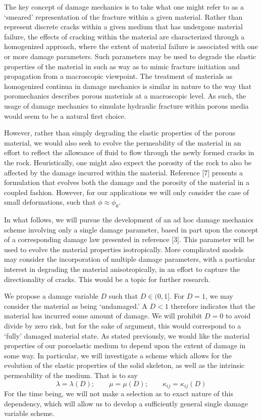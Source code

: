 \documentclass[11pt]{article} %
\begin{document}
The key concept of damage mechanics is to take what one might refer to as a `smeared' representation of the fracture within a given material. Rather than represent discrete cracks within a given medium that has undergone material failure, the effects of cracking within the material are characterized through a homogenized approach, where the extent of material failure is associated with one or more damage parameters. Such parameters may be used to degrade the elastic properties of the material in such as way as to mimic fracture initiation and propagation from a macroscopic viewpoint. The treatment of materials as homogenized continua in damage mechanics is similar in nature to the way that poromechanics describes porous materials at a macroscopic level. As such, the usage of damage mechanics to simulate hydraulic fracture within porous media would seem to be a natural first choice.

However, rather than simply degrading the elastic properties of the porous material, we would also seek to evolve the permeability of the material in an effort to reflect the allowance of fluid to flow through the newly formed cracks in the rock. Heuristically, one might also expect the porosity of the rock to also be affected by the damage incurred within the material. Reference [7] presents a formulation that evolves both the damage and the porosity of the material in a coupled fashion. However, for our applications we will only consider the case of small deformations, such that $\phi \approx \phi_0$.

In what follows, we will pursue the development of an ad hoc damage mechanics scheme involving only a single damage parameter, based in part upon the concept of a corresponding damage law presented in reference [3]. This parameter will be used to evolve the material properties isotropically. More complicated models may consider the incorporation of multiple damage parameters, with a particular interest in degrading the material anisotropically, in an effort to capture the directionality of cracks. This would be a topic for further research.

We propose a damage variable $D$ such that $D \in (0,1]$. For $D = 1$, we may consider the material as being `undamaged.' A $D < 1$ therefore indicates that the material has incurred some amount of damage. We will prohibit $D = 0$ to avoid divide by zero risk, but for the sake of argument, this would correspond to a `fully' damaged material state. As stated previously, we would like the material properties of our poroelastic medium to depend upon the extent of damage in some way. In particular, we will investigate a scheme which allows for the evolution of the elastic properties of the solid skeleton, as well as the intrinsic permeability of the medium. That is to say
\begin{equation}
	\lambda = \lambda (D); \qquad \mu = \mu (D); \qquad \kappa_{ij} = \kappa_{ij} (D)
\end{equation}
For the time being, we will not make a selection as to exact nature of this dependency, which will allow us to develop a sufficiently general single damage variable scheme.
\end{document}
